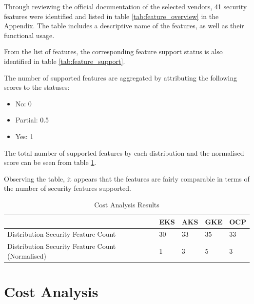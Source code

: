 Through reviewing the official documentation of the selected vendors, 41 security features were identified and listed in table \ref{tab:feature_overview} in the Appendix. The table includes a descriptive name of the features, as well as their functional usage. 

From the list of features, the corresponding feature support status is also identified in table \ref{tab:feature_support}.

The number of supported features are aggregated by attributing the following scores to the statuses:


\begin{itemize}
\tightlist
\item
  No: 0
\item
  Partial: 0.5
\item
  Yes: 1
\end{itemize}



The total number of supported features by each distribution and the normalised score can be seen from table \ref{tab:feature-score}.

Observing the table, it appears that the features are fairly comparable in terms of the number of security features supported.

\begin{table}[!ht]
    \centering
    \begin{tabular}{|p{4cm}|p{2cm}|p{2cm}|p{2cm}|p{2cm}|} %
    \hline
         & EKS & AKS & GKE & OCP \\ \hline
        Distribution Security Feature Count& 30& 33& 35& 33\\ \hline
 Distribution Security Feature Count (Normalised)& 1& 3& 5&3\\\hline
    \end{tabular}
    \caption{Cost Analysis Results} 
    \label{tab:feature-score}
\end{table}

\section{Cost Analysis}

